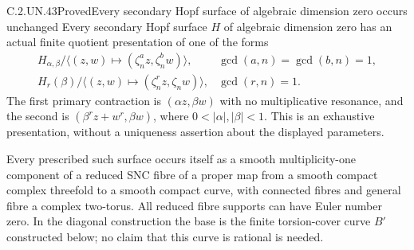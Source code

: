 \begin{statement}{C.2.UN.43}{Proved}{Every secondary Hopf surface of algebraic dimension zero occurs unchanged}
Every secondary Hopf surface $H$ of algebraic dimension zero
has an actual finite quotient presentation of one of the forms
\[
\begin{array}{ll}
 H_{\alpha,\beta}/\langle(z,w)\mapsto
          (\zeta_n^a z,\zeta_n^b w)\rangle,
 &\gcd(a,n)=\gcd(b,n)=1,\\[2pt]
 H_r(\beta)/\langle(z,w)\mapsto
          (\zeta_n^r z,\zeta_n w)\rangle,
 &\gcd(r,n)=1.
\end{array}
\tag{C.SH.1}
\]
The first primary contraction is $(\alpha z,\beta w)$ with no
multiplicative resonance, and the second is
$(\beta^r z+w^r,\beta w)$, where $0<|\alpha|,|\beta|<1$.
This is an exhaustive presentation, without a uniqueness
assertion about the displayed parameters.

Every prescribed such surface occurs itself as a smooth
multiplicity-one component of a reduced SNC fibre of a proper
map from a smooth compact complex threefold to a smooth
compact curve, with connected fibres and general fibre a
complex two-torus. All reduced fibre supports can have Euler
number zero. In the diagonal construction the base is the
finite torsion-cover curve $B'$ constructed below; no claim
that this curve is rational is needed.
\end{statement}

